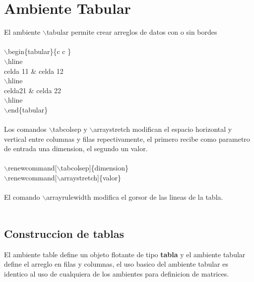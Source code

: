 \documentclass{article}
\begin{document}
	\section{Ambiente Tabular}
	El ambiente \textcolor{myGreen}{$\backslash$tabular} permite crear arreglos de datos con o sin bordes\\\\
	\textcolor{myGreen}{$\backslash$begin}\{tabular\}\{\textbar c \textbar c \textbar\}\\\textcolor{myGreen}{$\backslash$hline}\\
	celda 11 \& celda 12\\
	\textcolor{myGreen}{$\backslash$hline}\\
	celda21 \& celda 22\\
	\textcolor{myGreen}{$\backslash$hline}\\
	\textcolor{myGreen}{$\backslash$end}\{tabular\}\\\\
	Los comandos \textcolor{myGreen}{$\backslash$tabcolsep} y \textcolor{myGreen}{$\backslash$arraystretch} modifican el espacio horizontal y vertical entre columnas y filas repectivamente, el primero recibe como parametro de entrada una dimension, el segundo un valor.\\\\
	\textcolor{myGreen}{$\backslash$renewcommand}[$\backslash$tabcolsep]\{dimension\}\\\textcolor{myGreen}{$\backslash$renewcommand}[$\backslash$arraystretch]\{valor\}\\\\
	El comando \textcolor{myGreen}{$\backslash$arrayrulewidth} modifica el gorsor de las lineas de la tabla.\\\\

	\subsection{Construccion de tablas}
	El ambiente \textcolor{myGreen}{table} define un objeto flotante de tipo \textbf{tabla} y el ambiente \textcolor{myGreen}{tabular} define el arreglo en filas y columnas, el uso basico del ambiente \textcolor{myGreen}{tabular} es identico al uso de cualquiera de los ambientes para definicion de matrices.
	
	\renewcommand{\tabcolsep}{10pt}

	\renewcommand{\arraystretch}{1.5}
\end{document}
